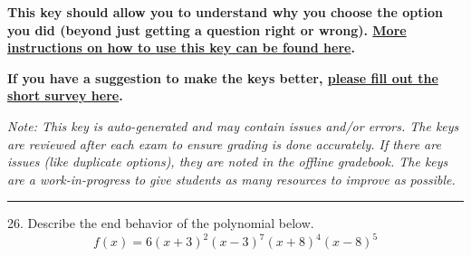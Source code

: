 \documentclass{article}[14pt]
\begin{document}
\textbf{This key should allow you to understand why you choose the option you did (beyond just getting a question right or wrong). \href{https://xronos.clas.ufl.edu/mac1105spring2020/courseDescriptionAndMisc/Exams/LearningFromResults}{More instructions on how to use this key can be found here}.}

\textbf{If you have a suggestion to make the keys better, \href{https://forms.gle/CZkbZmPbC9XALEE88}{please fill out the short survey here}.}

\textit{Note: This key is auto-generated and may contain issues and/or errors. The keys are reviewed after each exam to ensure grading is done accurately. If there are issues (like duplicate options), they are noted in the offline gradebook. The keys are a work-in-progress to give students as many resources to improve as possible.}

\rule{\textwidth}{0.4pt}

26. Describe the end behavior of the polynomial below.
$$ f(x) = 6(x + 3)^{2}(x - 3)^{7}(x + 8)^{4}(x - 8)^{5} $$ 
\end{document}
